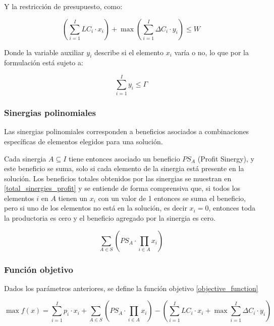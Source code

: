 \documentclass[spanish, a4paper, 12pt, openany,final]{book}
\begin{document}
    Y la restricción de presupuesto, como:
    
    \begin{equation}
   		\label{eq:costs}
    	\left( \sum_{i=1}^I LC_i\cdot x_i\right)  + \max \left( \sum_{i=1}^I \Delta C_i\cdot y_i \right) \leq W
    \end{equation}
    
    Donde la variable auxiliar $y_i$ describe si el elemento $x_i$ varía o no, lo que por la formulación está sujeto a:
    
    $$
    \sum_{i=1}^I y_i \leq \Gamma
    $$
    
    \subsubsection{Sinergias polinomiales}
    Las sinergias polinomiales corresponden a beneficios asociados a combinaciones específicas de elementos elegidos para una solución.
    
    Cada sinergia $A \subseteq I$ tiene entonces asociado un beneficio $PS_A$ (Profit Sinergy), y este beneficio se suma, solo si cada elemento de la sinergia está presente en la solución. Los beneficios totales obtenidos por las sinergias se muestran en \ref{total_sinergies_profit} y se entiende de forma comprensiva que, si todos los elementos $i$ en $A$ tienen un $x_i$ con un valor de 1 entonces se suma el beneficio, pero si uno de los elementos no está en la solución, es decir $x_i = 0$, entonces toda la productoria es cero y el beneficio agregado por la sinergia es cero.
    
    \begin{equation}
    	\label{total_sinergies_profit}
    	\sum_{A \in S}\left( PS_A \cdot \prod_{i \in A} x_i \right)
    \end{equation}
    
    
    \subsubsection{Función objetivo}
    Dados los parámetros anteriores, se define la función objetivo \ref{objective_function}
    
    \begin{center}
    	\begin{equation}
    		\max f(x) = \sum_{i=1}^I p_i\cdot x_i + 
    		\sum_{A \in S}\left( PS_A \cdot \prod_{i \in A} x_i \right)
    		- \left( \sum_{i=1}^I LC_i\cdot x_i  + \max  \sum_{i=1}^I \Delta C_i\cdot y_i \right)
    		\label{eq:objective_function}
    	\end{equation}
    \end{center}
    
\end{document}
